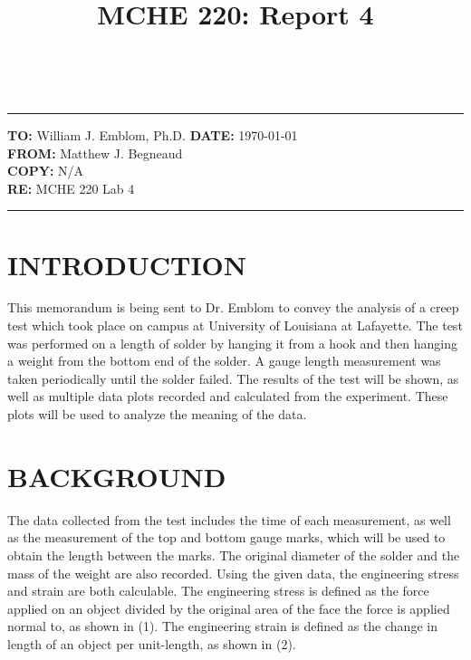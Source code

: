 \documentclass[12pt]{article}
\title{MCHE 220: Report 4}
\begin{document}
\fancyhf{}  
  \renewcommand{\headrulewidth}{0pt}
    \pagestyle{plain}
    
\captionsetup[table]{labelsep=space}

\begin{flushleft}
\hrulefill\\\hrule height 1pt
\vspace{5pt}
\textbf{TO: }William J. Emblom, Ph.D.  \hfill   \textbf{DATE: }\today                
\bigskip\\
\textbf{FROM: }Matthew J. Begneaud
\bigskip\\
\textbf{COPY: }N/A
\bigskip\\
\textbf{RE: }MCHE 220 Lab 4
\vspace{-10pt}
\end{flushleft}
\hrulefill \hrule height 1pt


\section*{\fontsize{12}{12}\selectfont INTRODUCTION}
This memorandum is being sent to Dr. Emblom to convey the analysis of a creep test which took place on campus at University of Louisiana at Lafayette. The test was performed on a length of solder by hanging it from a hook and then hanging a weight from the bottom end of the solder. A gauge length measurement was taken periodically until the solder failed. The results of the test will be shown, as well as multiple data plots recorded and calculated from the experiment. These plots will be used to analyze the meaning of the data.
\bigskip



\section*{\fontsize{12}{12}\selectfont BACKGROUND}
The data collected from the test includes the time of each measurement, as well as the measurement of the top and bottom gauge marks, which will be used to obtain the length between the marks. The original diameter of the solder and the mass of the weight are also recorded. Using the given data, the engineering stress and strain are both calculable. The engineering stress is defined as the force applied on an object divided by the original area of the face the force is applied normal to, as shown in (1). The engineering strain is defined as the change in length of an object per unit-length, as shown in (2).
\end{document}
